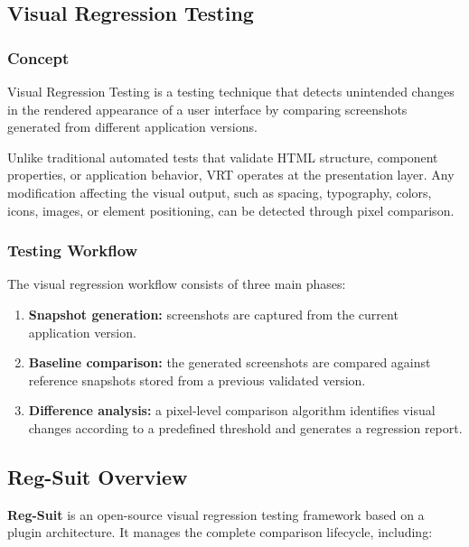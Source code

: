 \subsection{Visual Regression Testing}

\subsubsection{Concept}

Visual Regression Testing is a testing technique that detects unintended changes in the rendered appearance of a user interface by comparing screenshots generated from different application versions.

Unlike traditional automated tests that validate HTML structure, component properties, or application behavior, VRT operates at the presentation layer. Any modification affecting the visual output, such as spacing, typography, colors, icons, images, or element positioning, can be detected through pixel comparison.

\subsubsection{Testing Workflow}

The visual regression workflow consists of three main phases:

\begin{enumerate}
    \item \textbf{Snapshot generation:} screenshots are captured from the current application version.
    
    \item \textbf{Baseline comparison:} the generated screenshots are compared against reference snapshots stored from a previous validated version.
    
    \item \textbf{Difference analysis:} a pixel-level comparison algorithm identifies visual changes according to a predefined threshold and generates a regression report.
\end{enumerate}


\subsection{Reg-Suit Overview}

\textbf{Reg-Suit} is an open-source visual regression testing framework based on a plugin architecture. It manages the complete comparison lifecycle, including:

